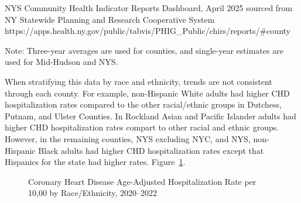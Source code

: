 \documentclass[
  english,
  letterpaper,
]{report}
\begin{document}
\begin{tcolorbox}[enhanced jigsaw, breakable, leftrule=.75mm, title=\textcolor{quarto-callout-note-color}{\faInfo}\hspace{0.5em}{Source}, bottomrule=.15mm, opacityback=0, left=2mm, colback=white, bottomtitle=1mm, coltitle=black, colbacktitle=quarto-callout-note-color!10!white, colframe=quarto-callout-note-color-frame, opacitybacktitle=0.6, toptitle=1mm, titlerule=0mm, arc=.35mm, rightrule=.15mm, toprule=.15mm]

NYS Community Health Indicator Reports Dashboard, April 2025 sourced
from NY Statewide Planning and Research Cooperative System
https://apps.health.ny.gov/public/tabvis/PHIG\_Public/chirs/reports/\#county

\end{tcolorbox}

\begin{tcolorbox}[enhanced jigsaw, breakable, leftrule=.75mm, title=\textcolor{quarto-callout-note-color}{\faInfo}\hspace{0.5em}{Note}, bottomrule=.15mm, opacityback=0, left=2mm, colback=white, bottomtitle=1mm, coltitle=black, colbacktitle=quarto-callout-note-color!10!white, colframe=quarto-callout-note-color-frame, opacitybacktitle=0.6, toptitle=1mm, titlerule=0mm, arc=.35mm, rightrule=.15mm, toprule=.15mm]

Note: Three-year averages are used for counties, and single-year
estimates are used for Mid-Hudson and NYS.

\end{tcolorbox}

When stratifying this data by race and ethnicity, trends are not
consistent through each county. For example, non-Hispanic White adults
had higher CHD hospitalization rates compared to the other racial/ethnic
groups in Dutchess, Putnam, and Ulster Counties. In Rockland Asian and
Pacific Islander adults had higher CHD hospitalization rates compart to
other racial and ethnic groups. However, in the remaining counties, NYS
excluding NYC, and NYS, non-Hispanic Black adults had higher CHD
hospitalization rates except that Hispanics for the state had higher
rates. Figure~\ref{fig-coronary-heart-disease-hospital-rande-aar}.

\begin{figure}


\caption{\label{fig-coronary-heart-disease-hospital-rande-aar}Coronary
Heart Disease Age-Adjusted Hospitalization Rate per 10,00 by
Race/Ethnicity, 2020--2022}

\end{figure}%
\end{document}
